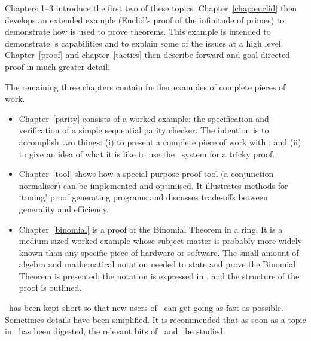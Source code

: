 Chapters 1--3 introduce the first two of these topics.
Chapter~\ref{chap:euclid} then develops an extended example (Euclid's
proof of the infinitude of primes) to demonstrate how \HOL{} is used
to prove theorems.  This example is intended to demonstrate \HOL{}'s
capabilities and to explain some of the issues at a high level.
Chapter~\ref{proof} and chapter~\ref{tactics} then describe forward
and goal directed proof in much greater detail.

The remaining three chapters contain further examples of complete
pieces of work.
\begin{itemize}
\item Chapter~\ref{parity} consists of a worked example: the
  specification and verification of a simple sequential parity
  checker.  The intention is to accomplish two things: (i) to present
  a complete piece of work with \HOL; and (ii) to give an idea of what
  it is like to use the \HOL\ system for a tricky proof.

\item Chapter~\ref{tool} shows how a special purpose proof tool (a
  conjunction normaliser) can be implemented and optimised. It
  illustrates methods for `tuning' proof generating programs and
  discusses trade-offs between generality and efficiency.

\item Chapter~\ref{binomial} is a proof of the Binomial Theorem in a
  ring.  It is a medium sized worked example whose subject matter is
  probably more widely known than any specific piece of hardware or
  software. The small amount of algebra and mathematical notation
  needed to state and prove the Binomial Theorem is presented; the
  notation is expressed in \HOL{}, and the structure of the proof is
  outlined.

\end{itemize}

\noindent
\TUTORIAL\ has been kept short so that new users of \HOL\ can get
going as fast as possible. Sometimes details have been simplified. It
is recommended that as soon as a topic in \TUTORIAL\ has been
digested, the relevant bits of \DESCRIPTION\ and \REFERENCE\ be
studied.

